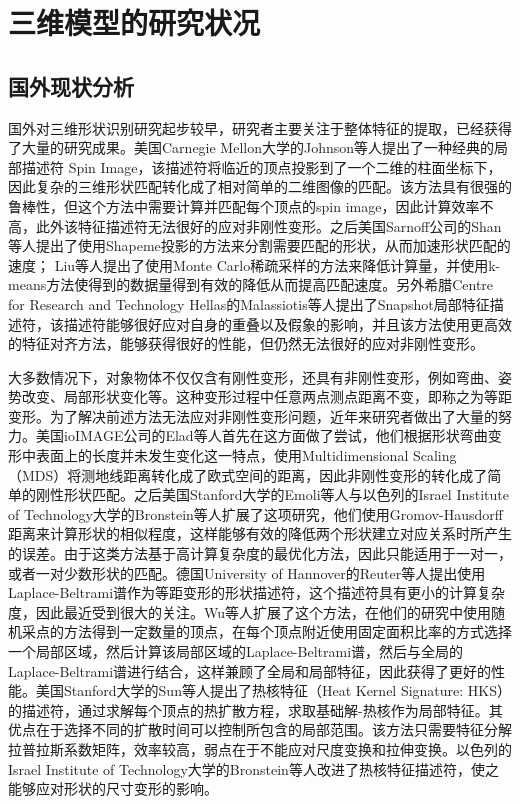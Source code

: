 \documentclass[twoside,UTF8]{nputhesis}
\begin{document}
\section{三维模型的研究状况}

\subsection{国外现状分析}
国外对三维形状识别研究起步较早，研究者主要关注于整体特征的提取，已经获得了大量的研究成果\cite{Tangelder2008A,Funkhouser2005Shape,Krizhevsky2017ImageNet,Kaick2010A,Ullman1985Three, Loncaric1998A, Campbell2001A}。美国Carnegie Mellon大学的Johnson等人\cite{Johnson2002Using}提出了一种经典的局部描述符 Spin Image，该描述符将临近的顶点投影到了一个二维的柱面坐标下，因此复杂的三维形状匹配转化成了相对简单的二维图像的匹配。该方法具有很强的鲁棒性，但这个方法中需要计算并匹配每个顶点的spin image，因此计算效率不高，此外该特征描述符无法很好的应对非刚性变形。之后美国Sarnoff公司的Shan等人\cite{Shan2006Shapeme}提出了使用Shapeme投影的方法来分割需要匹配的形状，从而加速形状匹配的速度； Liu等人\cite{Liu2006Shape}提出了使用Monte Carlo稀疏采样的方法来降低计算量，并使用k-means方法使得到的数据量得到有效的降低从而提高匹配速度。另外希腊Centre for Research and Technology Hellas的Malassiotis等人\cite{Malassiotis2007Snapshots}提出了Snapshot局部特征描述符，该描述符能够很好应对自身的重叠以及假象的影响，并且该方法使用更高效的特征对齐方法，能够获得很好的性能，但仍然无法很好的应对非刚性变形。

大多数情况下，对象物体不仅仅含有刚性变形，还具有非刚性变形，例如弯曲、姿势改变、局部形状变化等。这种变形过程中任意两点测点距离不变，即称之为等距变形。为了解决前述方法无法应对非刚性变形问题，近年来研究者做出了大量的努力。美国ioIMAGE公司的Elad等人\cite{Elad2001Bending}首先在这方面做了尝试，他们根据形状弯曲变形中表面上的长度并未发生变化这一特点，使用Multidimensional Scaling （MDS）将测地线距离转化成了欧式空间的距离，因此非刚性变形的转化成了简单的刚性形状匹配。之后美国Stanford大学的Emoli等人\cite{M2005A}与以色列的Israel Institute of Technology大学的Bronstein等人\cite{Bronstein2006Efficient}扩展了这项研究，他们使用Gromov-Hausdorff距离来计算形状的相似程度，这样能够有效的降低两个形状建立对应关系时所产生的误差。由于这类方法基于高计算复杂度的最优化方法，因此只能适用于一对一，或者一对少数形状的匹配。德国University of Hannover的Reuter等人\cite{Reuter2006Laplace}提出使用Laplace-Beltrami谱作为等距变形的形状描述符，这个描述符具有更小的计算复杂度，因此最近受到很大的关注。Wu等人\cite{Wu2010Global}扩展了这个方法，在他们的研究中使用随机采点的方法得到一定数量的顶点，在每个顶点附近使用固定面积比率的方式选择一个局部区域，然后计算该局部区域的Laplace-Beltrami谱，然后与全局的Laplace-Beltrami谱进行结合，这样兼顾了全局和局部特征，因此获得了更好的性能。美国Stanford大学的Sun等人\cite{Sun2009A}提出了热核特征（Heat Kernel Signature: HKS）的描述符，通过求解每个顶点的热扩散方程，求取基础解-热核作为局部特征。其优点在于选择不同的扩散时间可以控制所包含的局部范围。该方法只需要特征分解拉普拉斯系数矩阵，效率较高，弱点在于不能应对尺度变换和拉伸变换。以色列的Israel Institute of Technology大学的Bronstein等人\cite{Bronstein2010Scale}改进了热核特征描述符，使之能够应对形状的尺寸变形的影响。
\end{document}
